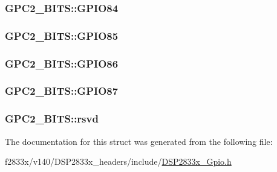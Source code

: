 \subsubsection[{G\+P\+I\+O84}]{ G\+P\+C2\+\_\+\+B\+I\+T\+S\+::\+G\+P\+I\+O84}\label{struct_g_p_c2___b_i_t_s_a2f60c850e507621ad1bdcf5444829222}
\hypertarget{struct_g_p_c2___b_i_t_s_a419248a27ec8d4bc6d43cb98d9eb93d5}{}
\subsubsection[{G\+P\+I\+O85}]{ G\+P\+C2\+\_\+\+B\+I\+T\+S\+::\+G\+P\+I\+O85}\label{struct_g_p_c2___b_i_t_s_a419248a27ec8d4bc6d43cb98d9eb93d5}
\hypertarget{struct_g_p_c2___b_i_t_s_a51099c7bb3a765aa72779b565c7a1853}{}
\subsubsection[{G\+P\+I\+O86}]{ G\+P\+C2\+\_\+\+B\+I\+T\+S\+::\+G\+P\+I\+O86}\label{struct_g_p_c2___b_i_t_s_a51099c7bb3a765aa72779b565c7a1853}
\hypertarget{struct_g_p_c2___b_i_t_s_a9c1322fbac1f58523ef4b61135b106a7}{}
\subsubsection[{G\+P\+I\+O87}]{ G\+P\+C2\+\_\+\+B\+I\+T\+S\+::\+G\+P\+I\+O87}\label{struct_g_p_c2___b_i_t_s_a9c1322fbac1f58523ef4b61135b106a7}
\hypertarget{struct_g_p_c2___b_i_t_s_a35d73a467a0e30d316fb4e2917586241}{}
\subsubsection[{rsvd}]{ G\+P\+C2\+\_\+\+B\+I\+T\+S\+::rsvd}\label{struct_g_p_c2___b_i_t_s_a35d73a467a0e30d316fb4e2917586241}


The documentation for this struct was generated from the following file\+:\begin{DoxyCompactItemize}
\item 
f2833x/v140/\+D\+S\+P2833x\+\_\+headers/include/\hyperlink{_d_s_p2833x___gpio_8h}{D\+S\+P2833x\+\_\+\+Gpio.\+h}\end{DoxyCompactItemize}
